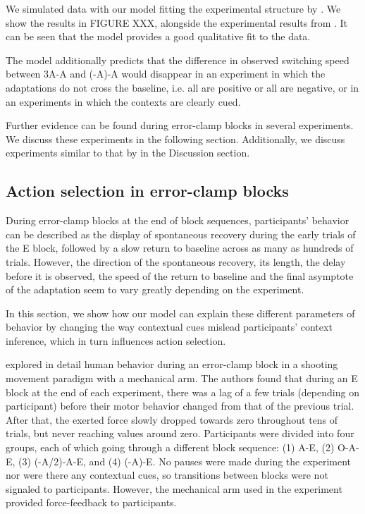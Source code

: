 \documentclass[a4paper,doc,floatsintext,natbib]{apa6}
\begin{document}
We simulated data with our model fitting the experimental structure by \cite{Davidson_Scaling_2004}. We show the results in FIGURE XXX, alongside the experimental results from \cite{Davidson_Scaling_2004}. It can be seen that the model provides a good qualitative fit to the data.

The model additionally predicts that the difference in observed switching speed between 3A-A and (-A)-A would disappear in an experiment in which the adaptations do not cross the baseline, i.e. all are positive or all are negative, or in an experiments in which the contexts are clearly cued.

Further evidence can be found during error-clamp blocks in several experiments. We discuss these experiments in the following section. Additionally, we discuss experiments similar to that by \cite{Davidson_Scaling_2004} in the Discussion section.


\subsection{Action selection in error-clamp blocks}
During error-clamp blocks at the end of block sequences, participants' behavior can be described as the display of spontaneous recovery during the early trials of the E block, followed by a slow return to baseline across as many as hundreds of trials. However, the direction of the spontaneous recovery, its length, the delay before it is observed, the speed of the return to baseline and the final asymptote of the adaptation seem to vary greatly depending on the experiment.

In this section, we show how our model can explain these different parameters of behavior by changing the way contextual cues mislead participants' context inference, which in turn influences action selection.

\cite{Vaswani_Decay_2013} explored in detail human behavior during an error-clamp block in a shooting movement paradigm with a mechanical arm. The authors found that during an E block at the end of each experiment, there was a lag of a few trials (depending on participant) before their motor behavior changed from that of the previous trial. After that, the exerted force slowly dropped towards zero throughout tens of trials, but never reaching values around zero. Participants were divided into four groups, each of which going through a different block sequence: (1) A-E, (2) O-A-E, (3) (-A/2)-A-E, and (4) (-A)-E. No pauses were made during the experiment nor were there any contextual cues, so transitions between blocks were not signaled to participants. However, the mechanical arm used in the experiment provided force-feedback to participants.
\end{document}

